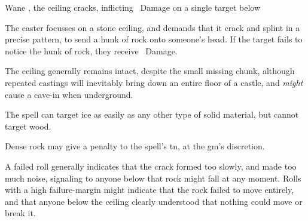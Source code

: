   {\mEarth}%
  {Wane}%
  {\distant,\detailed}%
  {}%
  {the ceiling cracks, inflicting \rollConv\ Damage on a single target below}%
  {
    The caster focusses on a stone ceiling, and demands that it crack and splint in a precise pattern, to send a hunk of rock onto someone's head.
    If the target fails to notice the hunk of rock, they receive \rollConv\ Damage.

    The ceiling generally remains intact, despite the small missing chunk, although repeated castings will inevitably bring down an entire floor of a castle, and \emph{might} cause a cave-in when underground.

    The spell can target ice as easily as any other type of solid material, but cannot target wood.

    Dense rock may give a penalty to the spell's \gls{tn}, at the \gls{gm}'s discretion.

    A failed roll generally indicates that the crack formed too slowly, and made too much noise, signaling to anyone below that rock might fall at any moment.
    Rolls with a high failure-margin might indicate that the rock failed to move entirely, and that anyone below the ceiling clearly understood that nothing could move or break it.
  }

